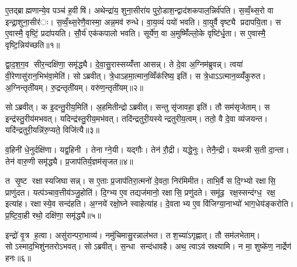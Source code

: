 


ए॒तद्ब्राह्मणान्ये॒व पञ्च॑ ह॒वीषि॑। अथेन्द्रा॑य॒ शुना॒सीरा॑य पुरो॒डाश॒न्द्वाद॑शकपाल॒न्निर्व॑पति। स॒व्वँ॒थ्स॒रो वा इन्द्रा॒शुना॒सीर॑ः। स॒व्वँ॒थ्स॒रेणै॒वास्मा॒ अन्न॒मव॑ रुन्धे। वा॒य॒व्यं॑ पयो॑ भवति। वा॒युर्वै वृष्ट्यै प्रदापयि॒ता। स ए॒वास्मै॒ वृष्टिं॒ प्रदा॑पयति। सौ॒र्य॑ एक॑कपालो भवति। सूर्ये॑ण॒ वा अ॒मुष्मिँ॑ल्लो॒के वृष्टि॑र्धृ॒ता। स ए॒वास्मै॒ वृष्टि॒न्निय॑च्छति॥१॥

द्वा॒द॒श॒ग॒व सीर॒न्दक्षि॑णा॒ समृ॑द्ध्यै। दे॒वा॒सु॒रास्सय्यँ॑त्ता आसन्न्। ते दे॒वा अ॒ग्निम॑ब्रुवन्न्। त्वया॑ वी॒रेणासु॑रान॒भिभ॑वा॒मेति॑। सोऽब्रवीत्। त्रे॒धाऽहमा॒त्मान॒व्विँक॑रिष्य॒ इति॑। स त्रे॒धाऽऽत्मान॒व्व्यँ॑कुरुत। अ॒ग्निन्तृती॑यम्। रु॒द्रन्तृती॑यम्। वरु॑ण॒न्तृती॑यम्॥२॥

सोऽब्रवीत्। क इ॒दन्तु॒रीय॒मिति॑। अ॒हमितीन्द्रोऽब्रवीत्। सन्तु सृ॑जावहा॒ इति॑। तौ सम॑सृजेताम्। स इन्द्र॑स्तु॒रीय॑मभवत्। यदिन्द्र॑स्तु॒रीय॒मभ॑वत्। तदि॑न्द्रतुरी॒यस्येन्द्रतुरीय॒त्वम्। ततो॒ वै दे॒वा व्य॑जयन्त। यदि॑न्द्रतुरी॒यन्नि॑रु॒प्यते॒ विजि॑त्यै॥३॥

व॒हिनी॑ धे॒नुर्दक्षि॑णा। यद्व॒हिनी। तेनाग्ने॒यी। यद्गौः। तेन॑ रौ॒द्री। यद्धे॒नुः। तेनै॒न्द्री। यथ्स्त्री स॒ती दा॒न्ता। तेन॑ वारु॒णी समृ॑द्ध्यै। प्र॒जाप॑तिर्य॒ज्ञम॑सृजत॥४॥

त सृ॒ष्ट रक्षास्यजिघासन्न्। स ए॒ताः प्र॒जाप॑तिरा॒त्मनो॑ दे॒वता॒ निर॑मिमीत। ताभि॒र्वै स दि॒ग्भ्यो रक्षासि॒ प्राणु॑दत। यत्प॑ञ्चाव॒त्तीय॑ञ्जु॒होति॑। दि॒ग्भ्य ए॒व तद्यज॑मानो॒ रक्षासि॒ प्रणु॑दते। समू॑ढ॒ रक्ष॒स्सन्द॑ग्ध॒ रक्ष॒ इत्या॑ह। रक्षास्ये॒व सन्द॑हति। अ॒ग्नये॑ रक्षो॒घ्ने स्वाहेत्या॑ह। दे॒वताभ्य ए॒व वि॑जिग्या॒नाभ्यो॑ भाग॒धेय॑ङ्करोति। प्र॒ष्टि॒वा॒ही रथो॒ दक्षि॑णा॒ समृ॑द्ध्यै॥५॥

इन्द्रो॑ वृ॒त्र ह॒त्वा। असु॑रान्परा॒भाव्य॑। नमु॑चिमासु॒रन्नाल॑भत। तश॒च्या॑ऽगृह्णात्। तौ सम॑लभेताम्। सोऽस्माद॒भिशु॑नतरोऽभवत्। सोऽब्रवीत्। स॒न्धा सन्द॑धावहै। अथ॒ त्वाऽव॑ स्रक्ष्यामि। न मा॒ शुष्के॑ण॒ नार्द्रेण॑ हनः॥६॥

